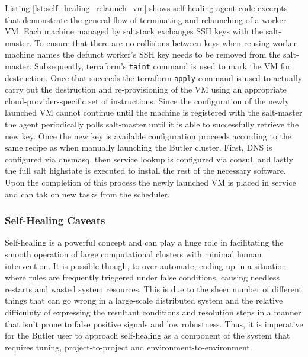 Listing \ref{lst:self_healing_relaunch_vm} shows self-healing agent code excerpts that demonstrate the general flow of terminating and relaunching of a worker VM. Each machine managed by saltstack exchanges SSH keys with the salt-master. To ensure that there are no collisions between keys when reusing worker machine names the defunct worker's SSH key needs to be removed from the salt-master. Subsequently, terraform's \texttt{taint} command is used to mark the VM for destruction. Once that succeeds the terraform \texttt{apply} command is used to actually carry out the destruction and re-provisioning of the VM using an appropriate cloud-provider-specific set of instructions. Since the configuration of the newly launched VM cannot continue until the machine is registered with the salt-master the agent periodically polls salt-master until it is able to successfully retrieve the new key. Once the new key is available configuration proceeds according to the same recipe as when manually launching the Butler cluster. First, DNS is configured via dnsmasq, then service lookup is configured via consul, and lastly the full salt highstate is executed to install the rest of the necessary software. Upon the completion of this process the newly launched VM is placed in service and can tak on new tasks from the scheduler.

\subsubsection{Self-Healing Caveats}

Self-healing is a powerful concept and can play a huge role in facilitating the smooth operation of large computational clusters with minimal human intervention. It is possible though, to over-automate, ending up in a situation where rules are frequently triggered under false conditions, causing needless restarts and wasted system resources. This is due to the sheer number of different things that can go wrong in a large-scale distributed system and the relative difficuluty of expressing the resultant conditions and resolution steps in a manner that isn't prone to false positive signals and low robustness. Thus, it is imperative for the Butler user to approach self-healing as a component of the system that requires tuning, project-to-project and environment-to-environment. 

